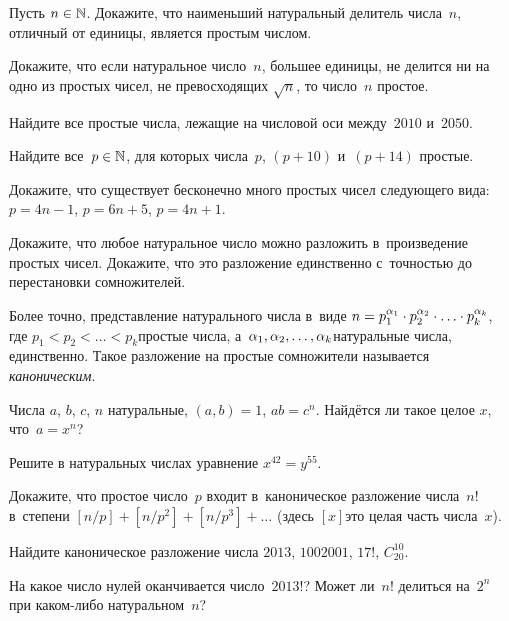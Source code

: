 \documentclass[a4paper,12pt]{article}
\begin{document}

Пусть $n\in\mathbb{N}$. Докажите, что наименьший натуральный делитель числа~$n$, отличный от единицы, является простым числом.

Докажите, что если натуральное число~$n$, большее единицы, не делится ни на одно из простых чисел, не превосходящих $\sqrt{n}$, то число~$n$ простое.

Найдите все простые числа, лежащие на числовой оси между~$2010$ и~$2050$.

Найдите все~$p\in\mathbb{N}$, для которых числа~$p$, $(p+10)$ и~$(p+14)$ простые.

Докажите, что существует бесконечно много простых чисел следующего вида:\\
$p=4n-1$,
$p=6n+5$,
$p=4n+1$.

Докажите, что любое натуральное число можно разложить в~произведение простых чисел.
Докажите, что это разложение единственно с~точностью до перестановки сомножителей.

Более точно, представление натурального числа в~виде $n=p_1^{\alpha_1}\cdot p_2^{\alpha_2}\cdot\ldots\cdot p_k^{\alpha_k}$, где $p_1<p_2<\ldots<p_k$\т простые числа, а~$\alpha_1,\alpha_2,\ldots,\alpha_k$\т натуральные числа, единственно. Такое разложение на простые сомножители называется \emph{каноническим}.

Числа $a$, $b$, $c$, $n$ натуральные, $(a,b) = 1$, $ab = c^n$. Найдётся ли такое целое $x$, что~$a = x^n$?

Решите в натуральных числах уравнение $x^{42} = y^{55}$.

Докажите, что простое число~$p$ входит в~каноническое разложение числа~$n!$ в~степени $[n/p]+[n/p^2]+[n/p^3]+\ldots$ (здесь $[x]$\т это целая часть числа~$x$).

Найдите каноническое разложение числа
$2013$,
$1002001$,
$17!$,
$C_{20}^{10}$.

На какое число нулей оканчивается число~$2013!$?
Может ли~$n!$ делиться на~$2^n$ при каком-либо натуральном~$n$?

\end{document}
